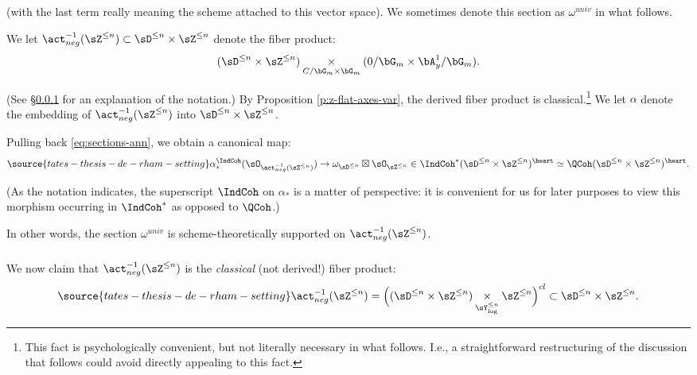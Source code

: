  (with the last term really meaning the
scheme attached to this vector space). We sometimes
denote this section as $\omega^{univ}$ in what
follows.

We let
$\act_{neg}^{-1}(\sZ^{\leq n}) \subset
\sD^{\leq n} \times \sZ^{\leq n}$ denote the fiber
product:
%
\[
(\sD^{\leq n} \times \sZ^{\leq n})
\underset{C/\bG_m\times\bG_m}{\times}
(0/\bG_m \times \bA_y^1/\bG_m).
\]

 (See \S \ref{ss:act-neg-rems} for
an explanation of the notation.)
By Proposition \ref{p:z-flat-axes-var}, the
derived fiber product is classical.\footnote{This
fact is psychologically convenient, but not literally
necessary in what follows. I.e., a straightforward
restructuring of the discussion that follows could avoid
directly appealing to this fact.} We let
$\alpha$ denote the embedding of
$\act_{neg}^{-1}(\sZ^{\leq n})$ into
$\sD^{\leq n} \times \sZ^{\leq n}$.

Pulling back \eqref{eq:sections-ann}, we obtain
a canonical map:
%
\begin{equation}\label{eq:supp}
\source{tates-thesis-de-rham-setting}
\alpha_*^{\IndCoh}
(\sO_{\act_{neg}^{-1}(\sZ^{\leq n})}) \to
\omega_{\sD^{\leq n}} \boxtimes \sO_{\sZ^{\leq n}}
\in \IndCoh^*(\sD^{\leq n} \times \sZ^{\leq n})^{\heart}
\simeq \QCoh(\sD^{\leq n} \times \sZ^{\leq n})^{\heart}.
\end{equation}

 (As the notation indicates, the
superscript $\IndCoh$ on $\alpha_*$ is a matter
of perspective: it is convenient for us for later
purposes to view this morphism occurring in $\IndCoh^*$
as opposed to $\QCoh$.)

\begin{rem}
\notready

In other words, the section $\omega^{univ}$
is scheme-theoretically supported on
$\act_{neg}^{-1}(\sZ^{\leq n})$.

\end{rem}

\subsubsection{}\label{ss:act-neg-rems}

We now claim that $\act_{neg}^{-1}(\sZ^{\leq n})$
is the \emph{classical} (not derived!) fiber
product:
%
\begin{equation}\label{eq:act-neg-rems}
\source{tates-thesis-de-rham-setting}
\act_{neg}^{-1}(\sZ^{\leq n}) =
\Big(
(\sD^{\leq n} \times \sZ^{\leq n})
\underset{\sY_{\log}^{\leq n}}{\times}
\sZ^{\leq n}
\Big)^{cl} \subset \sD^{\leq n} \times \sZ^{\leq n}.
\end{equation}

